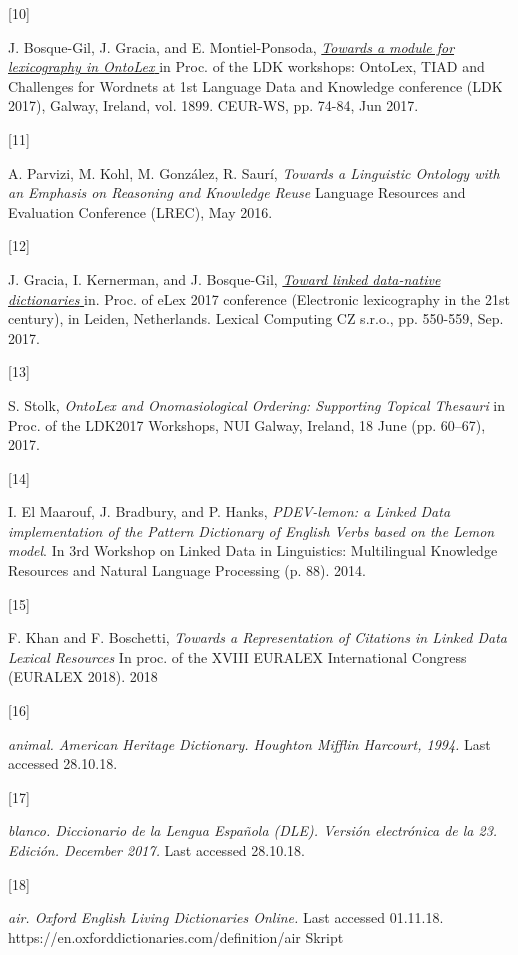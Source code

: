 \documentclass[a4paper]{article}
\newcommand\textstyleInternetlink[1]{\textcolor[rgb]{0.0,0.0,0.5019608}{#1}}
\newcommand\textstyleCitation[1]{\textit{#1}}
\begin{document}
[10] 

J. Bosque-Gil, J. Gracia, and E. Montiel-Ponsoda, \href{http://ceur-ws.org/Vol-1899/OntoLex_2017_paper_5.pdf}{\textstyleCitation{{\textquotedbl}Towards a module for lexicography in OntoLex{\textquotedbl} }}in Proc. of the LDK workshops: OntoLex, TIAD and Challenges for Wordnets at 1st Language Data and Knowledge conference (LDK 2017), Galway, Ireland, vol. 1899. CEUR-WS, pp. 74-84, Jun 2017. 

[11] 

A. Parvizi, M. Kohl, M. González, R. Saurí, \textstyleCitation{{\textquotedbl}Towards a Linguistic Ontology with an Emphasis on Reasoning and Knowledge Reuse{\textquotedbl}} Language Resources and Evaluation Conference (LREC), May 2016. 

[12] 

J. Gracia, I. Kernerman, and J. Bosque-Gil, \href{../../%20https://elex.link/elex2017/wp-content/uploads/2017/09/paper33.pdf}{\textstyleCitation{{\textquotedbl}Toward linked data-native dictionaries{\textquotedbl}}}\href{../../%20https://elex.link/elex2017/wp-content/uploads/2017/09/paper33.pdf}{\textstyleInternetlink{ }}in. Proc. of eLex 2017 conference (Electronic lexicography in the 21st century), in Leiden, Netherlands. Lexical Computing CZ s.r.o., pp. 550-559, Sep. 2017. 

[13] 

S. Stolk, \textstyleCitation{{\textquotedbl}OntoLex and Onomasiological Ordering: Supporting Topical Thesauri{\textquotedbl}} in Proc. of the LDK2017 Workshops, NUI Galway, Ireland, 18 June (pp. 60–67), 2017. 

[14] 

I. El Maarouf, J. Bradbury, and P. Hanks, \textstyleCitation{{\textquotedbl}PDEV-lemon: a Linked Data implementation of the Pattern Dictionary of English Verbs based on the Lemon model{\textquotedbl}}. In 3rd Workshop on Linked Data in Linguistics: Multilingual Knowledge Resources and Natural Language Processing (p. 88). 2014. 

[15] 

F. Khan and F. Boschetti, \textstyleCitation{{\textquotedbl}Towards a Representation of Citations in Linked Data Lexical Resources{\textquotedbl}} In proc. of the XVIII EURALEX International Congress (EURALEX 2018). 2018 

[16] 

\textstyleCitation{animal. American Heritage Dictionary. Houghton Mifflin Harcourt, 1994.} Last accessed 28.10.18. 

[17] 

\textstyleCitation{blanco. Diccionario de la Lengua Española (DLE). Versión electrónica de la 23. Edición. December 2017.} Last accessed 28.10.18. 

[18] 

\textstyleCitation{air. Oxford English Living Dictionaries Online. }Last accessed 01.11.18. https://en.oxforddictionaries.com/definition/air Skript
\end{document}
